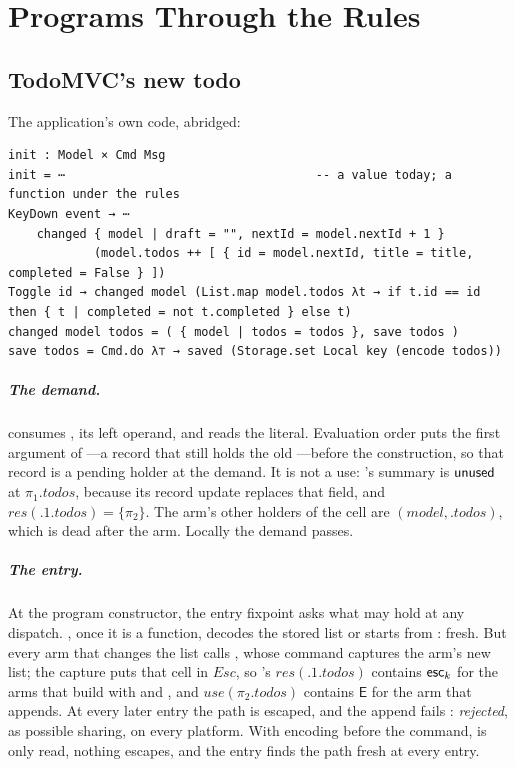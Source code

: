 \chapter{Programs Through the Rules}
\label{app:examples}

\section{TodoMVC's new todo}
\label{app:todomvc}

The application's own code, abridged:
\begin{Verbatim}
init : Model × Cmd Msg
init = ⋯                                   -- a value today; a function under the rules
KeyDown event → ⋯
    changed { model | draft = "", nextId = model.nextId + 1 }
            (model.todos ++ [ { id = model.nextId, title = title, completed = False } ])
Toggle id → changed model (List.map model.todos λt → if t.id == id then { t | completed = not t.completed } else t)
changed model todos = ( { model | todos = todos }, save todos )
save todos = Cmd.do λ⊤ → saved (Storage.set Local key (encode todos))
\end{Verbatim}

\paragraph{The demand.}  consumes , its left operand, and reads
the literal. Evaluation order puts the first argument of ---a record that still holds the old
---before the construction, so that record is a pending holder at the demand. It is not a use:
's summary is $\mathsf{unused}$ at $\pi_1.\mathit{todos}$, because its record update replaces that
field, and $\mathit{res}(.1.\mathit{todos}) = \{\pi_2\}$. The arm's other holders of the cell are
$(\mathit{model}, .\mathit{todos})$, which is dead after the arm. Locally the demand passes.

\paragraph{The entry.} At the program constructor, the entry fixpoint asks what  may hold
at any dispatch. , once it is a function, decodes the stored list or starts from \code{[]}: fresh.
But every arm that changes the list calls , whose command captures the arm's new list; the
capture puts that cell in $\mathit{Esc}$, so 's $\mathit{res}(.1.\mathit{todos})$ contains
$\mathsf{esc}_k$ for the arms that build with  and , and $\mathit{use}(\pi_2.\mathit{todos})$
contains $\mathsf{E}$ for the arm that appends. At every later entry the path is escaped, and the append
fails \Unescaped: \emph{rejected}, as possible sharing, on every platform. With  encoding before
the command,  is only read, nothing escapes, and the entry finds the path fresh at every entry.

